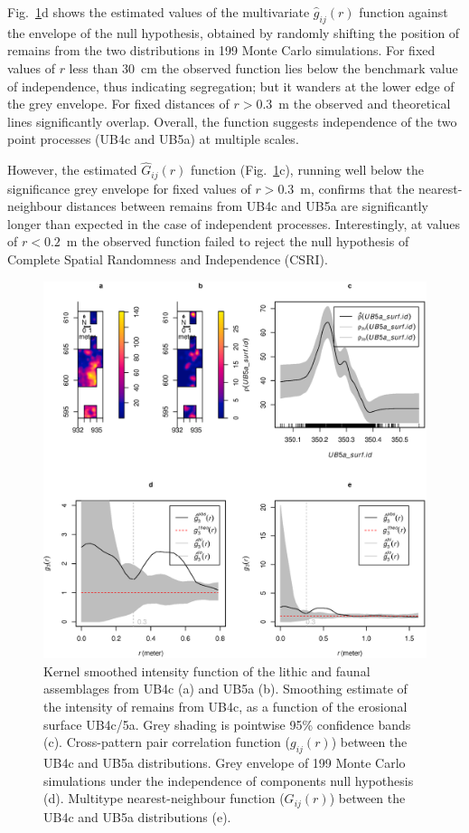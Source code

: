 \documentclass[preprint,authoryear,times]{elsarticle} %
\begin{document}
Fig.~\ref{fig:12}d shows the estimated values of the multivariate $\hat{g}_{ij}(r)$ function against the envelope of the null hypothesis, obtained by randomly shifting the position of remains from the two distributions in 199 Monte Carlo simulations. For fixed values of $r$ less than 30~cm the observed function lies below the benchmark value of independence, thus indicating segregation; but it wanders at the lower edge of the grey envelope. For fixed distances of $r>0.3$~m the observed and theoretical lines significantly overlap. Overall, the function suggests independence of the two point processes (UB4c and UB5a) at multiple scales.

However, the estimated $\hat{G}_{ij}(r)$ function (Fig.~\ref{fig:12}c), running well below the significance grey envelope for fixed values of $r>0.3$~m, confirms that the nearest-neighbour distances between remains from UB4c and UB5a are significantly longer than expected in the case of independent processes. Interestingly, at values of $r<0.2$~m the observed function failed to reject the null hypothesis of Complete Spatial Randomness and Independence (CSRI).

\begin{figure}[]
  \centering
  \includegraphics[width=1\textwidth]{../artwork/Fig12.eps}
  \caption{Kernel smoothed intensity function of the lithic and faunal assemblages from UB4c (a) and UB5a (b). Smoothing estimate of the intensity of remains from UB4c, as a function of the erosional surface UB4c/5a. Grey shading is pointwise 95\% confidence bands (c). Cross-pattern pair correlation function ($g_{ij}(r)$) between the UB4c and UB5a distributions. Grey envelope of 199 Monte Carlo simulations under the independence of components null hypothesis (d). Multitype nearest-neighbour function ($G_{ij}(r)$) between the UB4c and UB5a distributions (e).}
  \label{fig:12}
\end{figure}
\end{document}
